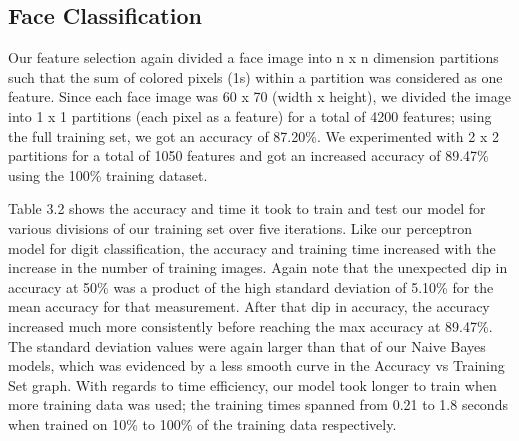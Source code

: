 \documentclass[10pt,parskip=half,
toc=sectionentrywithdots,
bibliography=totocnumbered,
captions=tableheading,numbers=noendperiod]{scrartcl}
\begin{document}
\hypertarget{face-classification}{%
\subsection{Face Classification}\label{face-classification}}

Our feature selection again divided a face image into n x n dimension
partitions such that the sum of colored pixels (1s) within a partition
was considered as one feature. Since each face image was 60 x 70 (width
x height), we divided the image into 1 x 1 partitions (each pixel as a
feature) for a total of 4200 features; using the full training set, we
got an accuracy of 87.20\%. We experimented with 2 x 2 partitions for a
total of 1050 features and got an increased accuracy of 89.47\% using
the 100\% training dataset.

Table 3.2 shows the accuracy and time it took to train and test our
model for various divisions of our training set over five iterations.
Like our perceptron model for digit classification, the accuracy and
training time increased with the increase in the number of training
images. Again note that the unexpected dip in accuracy at 50\% was a
product of the high standard deviation of 5.10\% for the mean accuracy
for that measurement. After that dip in accuracy, the accuracy increased
much more consistently before reaching the max accuracy at 89.47\%. The
standard deviation values were again larger than that of our Naive Bayes
models, which was evidenced by a less smooth curve in the Accuracy vs
Training Set graph. With regards to time efficiency, our model took
longer to train when more training data was used; the training times
spanned from 0.21 to 1.8 seconds when trained on 10\% to 100\% of the
training data respectively.
\end{document}

